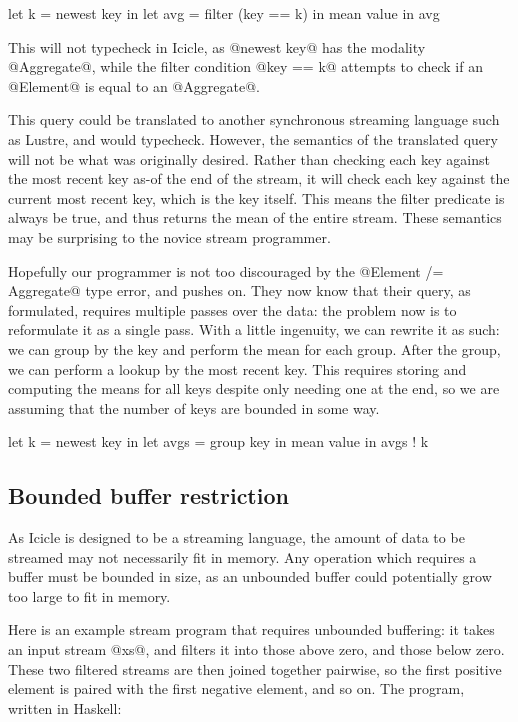 \begin{code}
   let k    = newest key
in let avg  = filter (key == k) in mean value
in avg
\end{code}

This will not typecheck in Icicle, as @newest key@ has the modality @Aggregate@, while the filter condition @key == k@ attempts to check if an @Element@ is equal to an @Aggregate@.

This query could be translated to another synchronous streaming language such as {\sc Lustre}\cite{halbwachs1991synchronous}, and would typecheck.
However, the semantics of the translated query will not be what was originally desired.
Rather than checking each key against the most recent key as-of the end of the stream,
it will check each key against the current most recent key, which is the key itself.
This means the filter predicate is always be true, and thus returns the mean of the entire stream.
These semantics may be surprising to the novice stream programmer.

Hopefully our programmer is not too discouraged by the @Element /= Aggregate@ type error, and pushes on.
They now know that their query, as formulated, requires multiple passes over the data: the problem now is to reformulate it as a single pass.
With a little ingenuity, we can rewrite it as such: we can group by the key and perform the mean for each group.
After the group, we can perform a lookup by the most recent key.
This requires storing and computing the means for all keys despite only needing one at the end, so we are assuming that the number of keys are bounded in some way.

\begin{code}
   let k    = newest key
in let avgs = group  key in mean value
in avgs ! k
\end{code}

\subsection{Bounded buffer restriction}
As Icicle is designed to be a streaming language, the amount of data to be streamed may not necessarily fit in memory.
Any operation which requires a buffer must be bounded in size, as an unbounded buffer could potentially grow too large to fit in memory.

Here is an example stream program that requires unbounded buffering:
it takes an input stream @xs@, and filters it into those above zero, and those below zero.
These two filtered streams are then joined together pairwise, so the first positive element is paired with the first negative element, and so on.
The program, written in Haskell:

